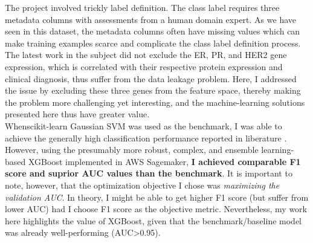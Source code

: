 \documentclass[11pt]{diazessay}
\begin{document}
The project involved trickly label definition. The class label requires three metadata columns with assessments from a human domain expert. As we have seen in this dataset, the metadata columns often have missing values which can make training examples scarce and complicate the class label definition process. \\

The latest work in the subject \cite{wu2021} did not exclude the ER, PR, and HER2 gene expression, which is correlated with their respective protein expression and clinical diagnosis, thus suffer from the data leakage problem. Here, I addressed the issue by excluding these three genes from the feature space, thereby making the problem more challenging yet interesting, and the machine-learning solutions presented here thus have greater value. \\

Whenscikit-learn Gaussian SVM was used as the benchmark, I was able to achieve the generally high classification performance reported in liberature \cite{wu2021}. However, using the presumably more robust, complex, and ensemble learning-based XGBoost implemented in AWS Sagemaker, \textbf{I achieved comparable F1 score and suprior AUC values than the benchmark}. It is important to note, however, that the optimization objective I chose was \textit{maximizing the validation AUC}. In theory, I might be able to get higher F1 score (but suffer from lower AUC) had I choose F1 score as the objective metric. Nevertheless, my work here highlights the value of XGBoost, given that the benchmark/baseline model was already well-performing (AUC>0.95).

\vskip0.4in



\end{document}
